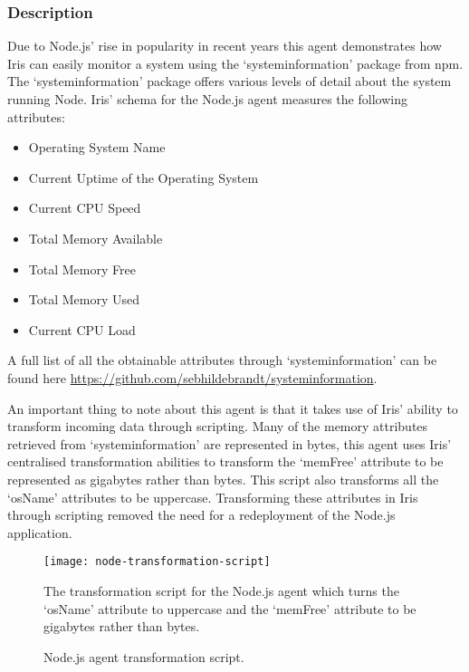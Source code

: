 \documentclass[12pt,a4paper,titlepage]{report}
\begin{document}
\subsubsection{Description}
Due to Node.js' rise in popularity in recent years this agent demonstrates how Iris can easily monitor a system using the `systeminformation' package from npm. The `systeminformation' package offers various levels of detail about the system running Node. Iris' schema for the Node.js agent measures the following attributes:
\begin{itemize}
    \item Operating System Name
    \item Current Uptime of the Operating System
    \item Current CPU Speed
    \item Total Memory Available
    \item Total Memory Free
    \item Total Memory Used
    \item Current CPU Load
\end{itemize}
A full list of all the obtainable attributes through `systeminformation' can be found here \url{https://github.com/sebhildebrandt/systeminformation}.

An important thing to note about this agent is that it takes use of Iris' ability to transform incoming data through scripting. Many of the memory attributes retrieved from `systeminformation' are represented in bytes, this agent uses Iris' centralised transformation abilities to transform the `memFree' attribute to be represented as gigabytes rather than bytes. This script also transforms all the `osName' attributes to be uppercase. Transforming these attributes in Iris through scripting removed the need for a redeployment of the Node.js application.

\begin{figure}[H]
\begin{tcolorbox}
\begin{center}
\texttt{[image: node-transformation-script]}
\end{center}
The transformation script for the Node.js agent which turns the `osName' attribute to uppercase and the `memFree' attribute to be gigabytes rather than bytes.
\end{tcolorbox}
\caption{Node.js agent transformation script.}
\end{figure}
\end{document}
